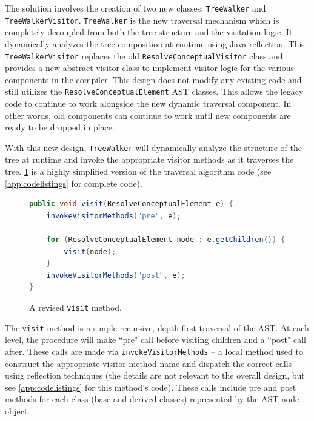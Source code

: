 \documentclass[times]{speauth}
\begin{document}
The solution involves the creation of two new classes: \texttt{TreeWalker} and \texttt{TreeWalkerVisitor}. \texttt{TreeWalker} is the new traversal mechanism which is completely decoupled from both the tree structure and the visitation logic. It dynamically analyzes the tree composition at runtime using Java reflection. This \texttt{TreeWalkerVisitor} replaces the old \texttt{ResolveConceptualVisitor} class and provides a new abstract visitor class to implement visitor logic for the various components in the compiler. This design does not modify any existing code and still utilizes the \texttt{ResolveConceptualElement} AST classes. This allows the legacy code to continue to work alongside the new dynamic traversal component. In other words, old components can continue to work until new components are ready to be dropped in place.

With this new design, \texttt{TreeWalker} will dynamically analyze the structure of the tree at runtime and invoke the appropriate visitor methods as it traverses the tree. \ref{fig:newvisit} is a highly simplified version of the traversal algorithm code (see \ref{app:codelistings} for complete code).

\begin{figure}[!htb]
\centering
\begin{minipage}{.80\textwidth}
\begin{lstlisting}[language=java]
public void visit(ResolveConceptualElement e) {
    invokeVisitorMethods("pre", e);

    for (ResolveConceptualElement node : e.getChildren()) {
        visit(node);
    }
    invokeVisitorMethods("post", e);
}
\end{lstlisting}
\end{minipage}
\caption{A revised \texttt{visit} method.}
\label{fig:newvisit}
\end{figure}

The \texttt{visit} method is a simple recursive, depth-first traversal of the AST. At each level, the procedure will make ``pre" call before visiting children and a ``post" call after. These calls are made via \texttt{invokeVisitorMethods} -- a local method used to construct the appropriate visitor method name and dispatch the correct calls using reflection techniques (the details are not relevant to the overall design, but see \ref{app:codelistings} for this method's code). These calls include pre and post methods for each class (base and derived classes) represented by the AST node object.
\end{document}
